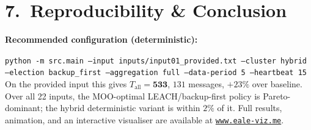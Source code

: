\documentclass[a4paper,10pt]{article}
\begin{document}
\vspace{-0.4em}
\section*{7.\ Reproducibility \& Conclusion}
\vspace{-0.4em}
\textbf{Recommended configuration (deterministic):}
\begin{center}
\end{center}
{\small\texttt{python -m src.main --input inputs/input01\_provided.txt --cluster hybrid --election backup\_first --aggregation full --data-period 5 --heartbeat 15}}\\[2pt]
On the provided input this gives $T_{\text{all}}=\mathbf{533}$, $131$ messages, $+23\%$ over baseline. Over all 22 inputs, the MOO-optimal LEACH/backup-first policy is Pareto-dominant; the hybrid deterministic variant is within $2\%$ of it. Full results, animation, and an interactive visualiser are available at \href{https://www.eale-viz.me}{\texttt{www.eale-viz.me}}.
\end{document}

